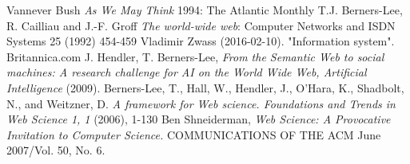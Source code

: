 \documentclass{sig-alternate-05-2015}
\begin{document}
\begin{thebibliography}{1}
 Vannever Bush {\em As We May Think} 1994: The Atlantic Monthly
 T.J. Berners-Lee, R. Cailliau and J.-F. Groff {\em The world-wide web}: Computer Networks and ISDN Systems 25 (1992) 454-459
 Vladimir Zwass (2016-02-10). "Information system". Britannica.com
 J. Hendler, T. Berners-Lee, {\em From the Semantic Web to social machines: A research challenge for AI on the World Wide Web, Artificial Intelligence} (2009).
 Berners-Lee, T., Hall, W., Hendler, J., O'Hara, K., Shadbolt, N., and Weitzner, D. {\em A framework for Web science. Foundations and Trends in Web Science 1, 1} (2006), 1-130
 Ben Shneiderman, {\em Web Science: A Provocative Invitation to Computer Science.} COMMUNICATIONS OF THE ACM June 2007/Vol. 50, No. 6.
\end{thebibliography}
\end{document}
